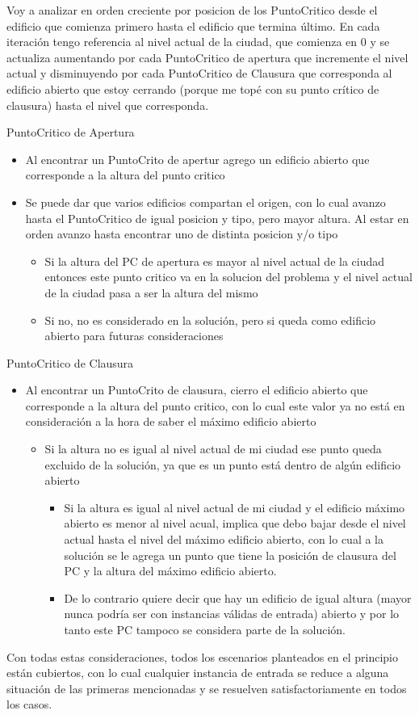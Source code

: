 Voy a analizar en orden creciente por posicion de los PuntoCritico desde el edificio que comienza primero hasta el edificio que termina último.
En cada iteración tengo referencia al nivel actual de la ciudad, que comienza en 0 y se actualiza aumentando por cada PuntoCritico de apertura que incremente el nivel actual y disminuyendo por cada PuntoCritico de Clausura que corresponda al edificio abierto que estoy cerrando (porque me topé con su punto crítico de clausura) hasta el nivel que corresponda.

PuntoCritico de Apertura
\begin{itemize}
		\item Al encontrar un PuntoCrito de apertur agrego un edificio abierto que corresponde a la altura del punto critico
		\item Se puede dar que varios edificios compartan el origen, con lo cual avanzo hasta el PuntoCritico de igual posicion y tipo, pero mayor altura. Al estar en orden avanzo hasta encontrar uno de distinta posicion y/o tipo
		\begin{itemize}
		\item Si la altura del PC de apertura es mayor al nivel actual de la ciudad entonces este punto critico va en la solucion del problema y el nivel actual de la ciudad pasa a ser la altura del mismo
		\item Si no, no es considerado en la solución, pero si queda como edificio abierto para futuras consideraciones
		\end{itemize}
\end{itemize}

PuntoCritico de Clausura
\begin{itemize}
		\item Al encontrar un PuntoCrito de clausura, cierro el edificio abierto que corresponde a la altura del punto critico, con lo cual este valor ya no está en consideración a la hora de saber el máximo edificio abierto
		\begin{itemize}
		\item Si la altura no es igual al nivel actual de mi ciudad ese punto queda excluido de la solución, ya que es un punto está dentro de algún edificio abierto
			\begin{itemize}
			\item Si la altura es igual al nivel actual de mi ciudad y el edificio máximo abierto es menor al nivel acual, implica que debo bajar desde el nivel actual hasta el nivel del máximo edificio abierto, con lo cual a la solución se le agrega un punto que tiene la posición de clausura del PC y la altura del máximo edificio abierto.
			\item De lo contrario quiere decir que hay un edificio de igual altura (mayor nunca podría ser con instancias válidas de entrada) abierto y por lo tanto este PC tampoco se considera parte de la solución.
			\end{itemize}
		\end{itemize}
\end{itemize}

Con todas estas consideraciones, todos los escenarios planteados en el principio están cubiertos, con lo cual cualquier instancia de entrada se reduce a alguna situación de las primeras mencionadas y se resuelven satisfactoriamente en todos los casos.


